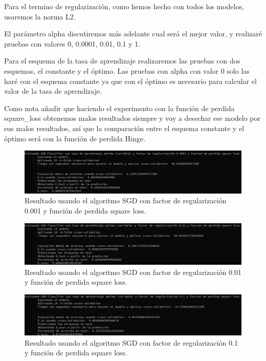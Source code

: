 \documentclass[12pt, spanish]{article}
\begin{document}
Para el termino de regularización, como hemos hecho con todos los modelos, usaremos la norma L2.

El parámetro alpha discutiremos más adelante cual será el mejor valor, y realizaré pruebas con valores 0, 0.0001, 0.01, 0.1 y 1.

Para el esquema de la tasa de aprendizaje realizaremos las pruebas con dos esquemas, el constante y el óptimo. Las pruebas con alpha con valor 0 solo las haré con el esquema constante ya que con el óptimo es necesario para calcular el valor de la tasa de aprendizaje.

Como nota añadir que haciendo el experimento con la función de perdida square\_loss obtenemos malos resultados siempre y voy a desechar ese modelo por sus malos resultados, así que la comparación entre el esquema constante y el óptimo será con la función de perdida Hinge.


\begin{figure}[H]
	\centering
	\hspace*{-1cm}\includegraphics[scale=0.4]{clasificacion/sgdLoss0001.png}
	\caption{Resultado usando el algoritmo SGD con factor de regularización 0.001 y función de perdida square loss.}
	\label{SGDL0001}
\end{figure}

\begin{figure}[H]
	\centering
	\hspace*{-1cm}\includegraphics[scale=0.4]{clasificacion/sgdLoss001.png}
	\caption{Resultado usando el algoritmo SGD con factor de regularización 0.01 y función de perdida square loss.}
	\label{SGDL001}
\end{figure}


\begin{figure}[H]
	\centering
	\hspace*{-1cm}\includegraphics[scale=0.4]{clasificacion/sgdLoss01.png}
	\caption{Resultado usando el algoritmo SGD con factor de regularización 0.1 y función de perdida square loss.}
	\label{SGDL01}
\end{figure}
\end{document}
